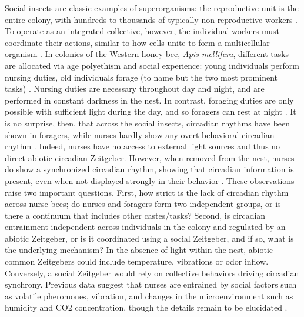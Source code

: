 \documentclass{article}
\newcommand{\added}[1]{{\color{blue}#1}}
\newcommand{\added}[1]{#1}
\begin{document}
Social insects are classic examples of superorganisms: the reproductive unit is the entire colony, with hundreds to thousands of typically non-reproductive workers \cite{holldobler_superorganism_2009}. To operate as an integrated collective, however, the individual workers must coordinate their actions, similar to how cells unite to form a multicellular organism \cite{smith_major_1997}. In colonies of the Western honey bee, \textit{Apis mellifera}, different tasks are allocated via age polyethism and social experience: young individuals perform nursing duties, old individuals forage (to name but the two most prominent tasks) \cite{seeley_adaptive_1982, wild_social_2021}. Nursing duties are necessary throughout day and night, and are performed in constant darkness in the nest. In contrast, foraging duties are only possible with sufficient light during the day, and so foragers can rest at night \cite{klein_caste-dependent_2008, klein_sleep_2010}. It is no surprise, then, that across the social insects, circadian rhythms have been shown in foragers, while nurses hardly show any \added{overt behavioral} circadian rhythm \cite{crailsheim_diurnal_1996, moore_timekeeping_1998, toma_changes_2000, shemesh_natural_2007, shemesh_molecular_2010, bloch_reversal_2001, fujioka2017ant, mildner2017plasticity, eban2011maternity}.
Indeed, nurses have no access to external light sources and thus no direct abiotic circadian Zeitgeber. However, when removed from the nest, nurses do show a synchronized circadian rhythm, showing that circadian information is present, even when not displayed strongly in their behavior \cite{fuchikawa_potent_2016, shemesh_natural_2007, shemesh_molecular_2010, siehler_remarkable_2021}. These observations raise two important questions. First, how strict is the lack of circadian rhythm across nurse bees; do nurses and foragers form two independent groups, or is there a continuum that includes other castes/tasks? Second, is circadian entrainment independent across individuals in the colony and regulated by an abiotic Zeitgeber, or is it coordinated using a social Zeitgeber, and if so, what is the underlying mechanism? In the absence of light within the nest, abiotic common Zeitgebers could include temperature, vibrations or odor inflow. Conversely, a social Zeitgeber would rely on collective behaviors driving circadian synchrony. Previous data suggest that nurses are entrained by social factors such as volatile pheromones, vibration, and changes in the microenvironment such as humidity and CO2 concentration, though the details remain to be elucidated \cite{fuchikawa_potent_2016}.
\end{document}

